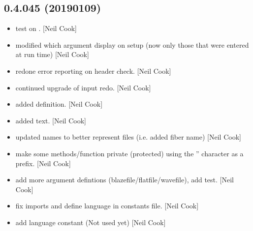 \documentclass[a4paper,10pt,english]{report}
\begin{document}
\subsection{0.4.045 (2019\sphinxhyphen{}01\sphinxhyphen{}09)}
\label{\detokenize{misc/changelog:id238}}\begin{itemize}
\item {} 
 \sphinxhyphen{} test on . {[}Neil Cook{]}

\item {} 
 \sphinxhyphen{} modified which argument display on setup (now only
those that were entered at run time) {[}Neil Cook{]}

\item {} 
 \sphinxhyphen{} redone error reporting on header check. {[}Neil Cook{]}

\item {} 
 \sphinxhyphen{} continued upgrade of input redo. {[}Neil Cook{]}

\item {} 
 \sphinxhyphen{} added  definition. {[}Neil Cook{]}

\item {} 
 \sphinxhyphen{} added  text. {[}Neil Cook{]}

\item {} 
 \sphinxhyphen{} updated names to better represent files (i.e. added
fiber name) {[}Neil Cook{]}

\item {} 
 \sphinxhyphen{} make some methods/function private (protected) using
the ” character as a prefix. {[}Neil Cook{]}

\item {} 
 \sphinxhyphen{} add more argument defintions
(blazefile/flatfile/wavefile), add  test. {[}Neil Cook{]}

\item {} 
 \sphinxhyphen{} fix imports and define language in constants
file. {[}Neil Cook{]}

\item {} 
 \sphinxhyphen{} add language constant (Not used yet) {[}Neil Cook{]}


\end{itemize}
\end{document}
